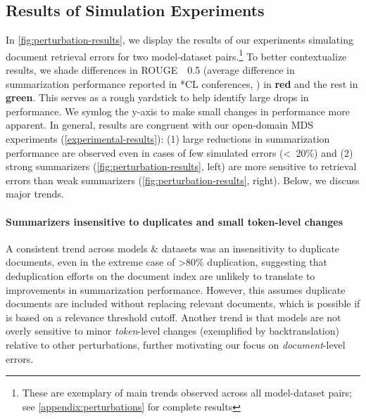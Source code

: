 \documentclass[11pt]{article}
\begin{document}
\subsection{Results of Simulation Experiments} \label{experimental-results:simulations}

In \autoref{fig:perturbation-results}, we display the results of our experiments simulating document retrieval errors for two model-dataset pairs.\footnote{These are exemplary of main trends observed across all model-dataset pairs; see \autoref{appendix:perturbations} for complete results} To better contextualize results, we shade differences in ROUGE~~0.5 (average difference in summarization performance reported in *CL conferences, \citealp{deutsch-etal-2022-examining}) in \textcolor{MyRed}{\textbf{red}} and the rest in \textcolor{MyGreen}{\textbf{green}}. This serves as a rough yardstick to help identify large drops in performance. We symlog \citep{symlog} the y-axis to make small changes in performance more apparent. In general, results are congruent with our open-domain MDS experiments (\textsection \ref{experimental-results}): (1) large reductions in summarization performance are observed even in cases of few simulated errors (<~20\%) and (2) strong summarizers (\autoref{fig:perturbation-results}, left) are more sensitive to retrieval errors than weak summarizers (\autoref{fig:perturbation-results}, right). Below, we discuss major trends.

\paragraph{Summarizers insensitive to duplicates and small token-level changes}
A consistent trend across models \& datasets was an insensitivity to duplicate documents, even in the extreme case of >80\% duplication, suggesting that deduplication efforts on the document index are unlikely to translate to improvements in summarization performance. However, this assumes duplicate documents are included without replacing relevant documents, which is possible if  is based on a relevance threshold cutoff. Another trend is that models are not overly sensitive to minor \textit{token}-level changes (exemplified by backtranslation) relative to other perturbations, further motivating our focus on \textit{document}-level errors.
\end{document}
